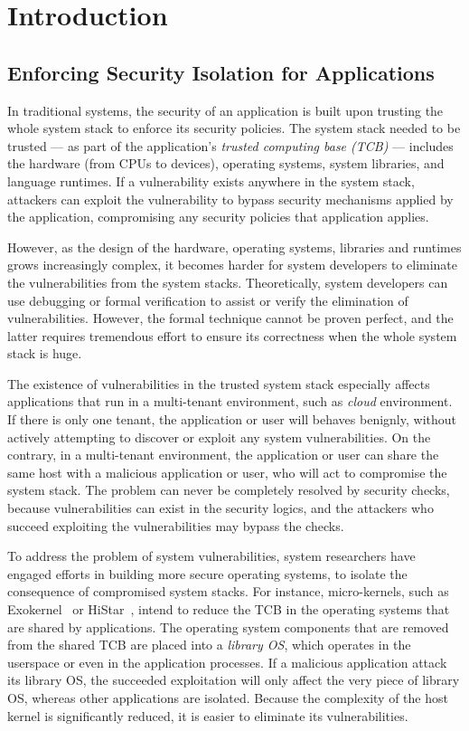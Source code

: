 \chapter{Introduction}
\label{chap:intro}

\section{Enforcing Security Isolation for Applications}
\label{sec:intro:isolation}

In traditional systems, the security of an application is built upon
trusting the whole system stack to enforce its security policies.
The system stack needed to be trusted
--- as part of the application's {\em trusted computing base (TCB)}
--- includes the hardware (from CPUs to devices), operating systems, system libraries, and language runtimes.
If a vulnerability exists anywhere in the system stack,
attackers can exploit the vulnerability to bypass security mechanisms applied by the application,
compromising any security policies that application applies.

However, as the design of the hardware, operating systems, libraries and runtimes grows increasingly complex,
it becomes harder for system developers to eliminate the vulnerabilities
from the system stacks.
Theoretically, system developers can use debugging or formal verification
to assist or verify the elimination of vulnerabilities.
However, the formal technique cannot be proven perfect, and the latter requires tremendous effort to ensure its correctness
when the whole system stack is huge.

The existence of vulnerabilities in the trusted system stack especially affects applications that run in a multi-tenant environment, such as {\em cloud} environment.
If there is only one tenant,
the application or user will behaves benignly,
without actively attempting to discover or exploit any system vulnerabilities.
On the contrary, in a multi-tenant environment,
the application or user can share the same host with a malicious application or user,
who will act to compromise the system stack.
The problem can never be completely resolved by security checks,
because vulnerabilities can exist in the security logics,
and the attackers who succeed exploiting the vulnerabilities may bypass the checks.

To address the problem of system vulnerabilities, system researchers have engaged efforts in building more secure operating systems,
to isolate the consequence of compromised system stacks.
For instance,
micro-kernels, such as Exokernel~\citep{engler95exokernel} or HiStar~\citep{zeldovich+histar},
intend to reduce the TCB in the operating systems that are shared by applications.
The operating system components that are removed from the shared TCB are placed into a {\em library OS}, which operates in the userspace or even in the application processes.
If a malicious application attack its library OS,
the succeeded exploitation will only affect the very piece of library OS,
whereas other applications are isolated.
Because the complexity of the host kernel is significantly reduced,
it is easier to eliminate its vulnerabilities.

